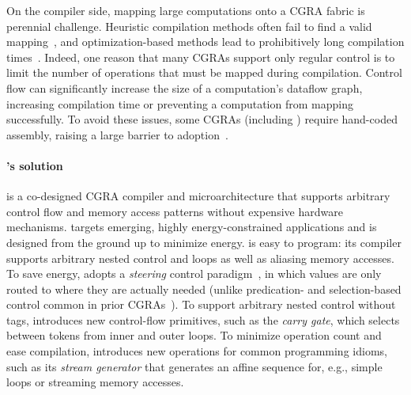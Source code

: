 On the compiler side, mapping large computations onto a CGRA fabric is
perennial challenge.
%
Heuristic compilation methods often fail to find a valid
mapping~\cite{chlorophyll,nowatzki2018hybrid}, and optimization-based methods lead to
prohibitively long compilation times~\cite{nowatzki2018hybrid,cgrame-ilp}.
%
Indeed, one reason that many CGRAs support only regular control is to limit
the number of operations that must be mapped during compilation.
%
Control flow can significantly increase the size of a computation's
dataflow graph, increasing compilation time or preventing a
computation from mapping successfully.
%
To avoid these issues, some CGRAs (including \snafu) require
hand-coded assembly, raising a large barrier to adoption~\cite{snafu,yang2021spzip,nowatzki:isca17:stream-dataflow}.

\paragraph{\riptide's solution}
%
\riptide is a co-designed CGRA compiler and microarchitecture that
supports arbitrary control flow and memory access patterns
without expensive hardware mechanisms.
%
\riptide targets emerging, highly energy-constrained applications
and is designed from the ground up to minimize energy.
%
\riptide is easy to program: its compiler supports arbitrary nested
control and loops as well as aliasing memory accesses.
%
To save energy, \riptide adopts a \emph{steering} control
paradigm~\cite{dennis1975preliminary,swanson2003wavescalar,budiu2005dataflow}, in which values are only routed to
where they are actually needed (unlike predication- and
selection-based control common in prior
CGRAs~\cite{trips,snafu}).
%
To support arbitrary nested control without tags, \riptide introduces new
control-flow primitives, such as the \emph{carry gate}, which selects
between tokens from inner and outer loops.
%
To minimize operation count and ease compilation,
\riptide introduces new operations for common programming idioms,
such as its \emph{stream generator} that generates an affine
sequence for, e.g., simple loops or streaming memory accesses.



